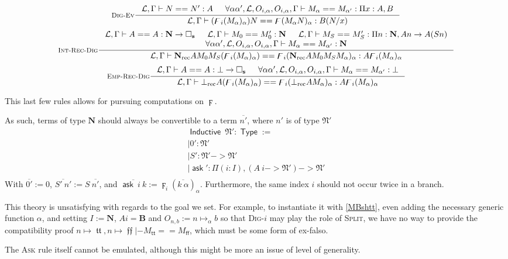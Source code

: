 \documentclass[11pt]{article}
\DeclareMathOperator{\Type}{\mathsf{Type}}
\DeclareMathOperator{\ask}{\mathsf{ask}}
\DeclareMathOperator{\Inductive}{\mathsf{Inductive}}
\DeclareMathOperator{\rec}{rec}
\DeclareMathOperator{\true}{\mathsf{tt}}
\DeclareMathOperator{\false}{\mathsf{ff}}
\DeclareMathOperator{\mtrue}{\mathfrak{tt}}
\DeclareMathOperator{\mfalse}{\mathfrak{ff}}
\newcommand{\ovl}{\overline}
\newcommand{\0}{\mathbf{0}}
\newcommand{\1}{\mathbf{1}}
\newcommand{\nat}{\mathbf{N}}
\newcommand{\mnat}{\mathfrak{N}}
\newcommand{\bool}{\mathbf{B}}
\newcommand{\tctx}{\Gamma}
\newcommand{\slvl}{\mathbf{s}}
\newcommand{\fctx}{\mathcal{L}}
\begin{document}
$$
    \inference[\textsc{Dig-Ev}]{\fctx,\tctx |- N == N' : A & \forall \alpha \alpha', \fctx, O_{i,\alpha},O_{i,\alpha},\tctx |- M_\alpha == M_{\alpha'} : \Pi x : A, B}{\fctx,\tctx |- (\digamma_i (M_\alpha)_\alpha) N == \digamma (M_\alpha N)_\alpha : B(N/x)}
$$
$$
    \inference[\textsc{Int-Rec-Dig}]{\fctx,\tctx |- A == A : \nat -> \square_\slvl & \fctx,\tctx |- M_0 == M'_0 : \nat & \fctx,\tctx |- M_S == M'_S : \Pi n : \nat, A n -> A (S n)\\ \forall \alpha \alpha', \fctx, O_{i,\alpha},O_{i,\alpha},\tctx |- M_\alpha == M_{\alpha'} : \nat}{\fctx,\tctx |- \nat_{\rec} AM_0M_S(\digamma_i (M_\alpha)_\alpha) == \digamma_i (\nat_{\rec}AM_0M_SM_\alpha)_\alpha : A \digamma_i (M_\alpha)_\alpha}
$$
$$
    \inference[\textsc{Emp-Rec-Dig}]{\fctx,\tctx |- A == A : \bot -> \square_\slvl & \forall \alpha \alpha', \fctx, O_{i,\alpha},O_{i,\alpha},\tctx |- M_\alpha == M_{\alpha'} : \bot}{\fctx,\tctx |- \bot_{\rec} A(\digamma_i (M_\alpha)_\alpha) == \digamma_i (\bot_{\rec}AM_\alpha)_\alpha : A \digamma_i (M_\alpha)_\alpha}
$$

This last few rules allows for pursuing computations on $\digamma$.

As such, terms of type $\nat$ should always be convertible to a term $\ovl{n'}$, where $n'$ is of type $\mnat'$
$$
\begin{array}{l}
    \Inductive\ \mnat' : \Type := \\
    \mid 0' : \mnat'\\
    \mid S' : \mnat' -> \mnat'\\
    \mid \ask' : \Pi (i : I),(A\ i -> \mnat') -> \mnat'\\
\end{array}
$$
With $\ovl{0'} := 0$, $\ovl{S'\ n'} := S\ \ovl{n'}$, and $\ovl{\ask\ i\ k} := \digamma_i (\ovl{k\ \alpha})_\alpha$. Furthermore, the same index $i$ should not occur twice in a branch.

This theory is unsatisfying with regards to the goal we set. For example, to instantiate it with \ref{MBshtt}, even adding the necessary generic function $\alpha$, and setting $I := \nat$, $A i = \bool$ and $O_{n,b} := n\mapsto_\alpha b$ so that \textsc{Dig}-$i$ may play the role of \textsc{Split}, we  have no way to provide the compatibility proof $n\mapsto \mtrue, n\mapsto \mfalse |- M_{\true} == M_{\false}$, which must be some form of ex-falso.

The \textsc{Ask} rule itself cannot be emulated, although this might be more an issue of level of generality.
\end{document}
